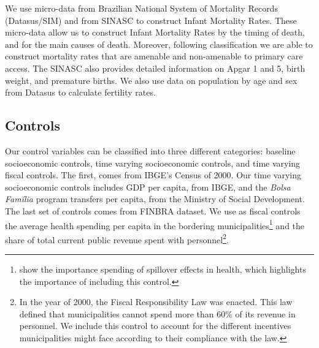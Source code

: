 We use micro-data from Brazilian National System of Mortality Records (Datasus/SIM) and from SINASC to construct Infant Mortality Rates. These micro-data allow us to construct Infant Mortality Rates by the timing of death, and for the main causes of death. Moreover, following \cite{alfradique2009internaccoes} classification we are able to construct mortality rates that are amenable and non-amenable to primary care access. The SINASC also provides detailed information on Apgar 1 and 5, birth weight, and premature births. We also use data on population by age and sex from Datasus to calculate fertility rates.


\subsection{Controls}

Our control variables can be classified into three different categories: baseline socioeconomic controls, time varying socioeconomic controls, and time varying fiscal controls. The first, comes from IBGE's Census of 2000. Our time varying socioeconomic controls includes GDP per capita, from IBGE, and the \emph{Bolsa Família} program transfers per capita, from the Ministry of Social Development. The last set of controls comes from FINBRA dataset. We use as fiscal controls the average health spending per capita in the bordering municipalities\footnote{\cite{castro2021effects} show the importance spending of spillover effects in health, which highlights the importance of including this control.} and the share of total current public revenue spent with personnel\footnote{In the year of 2000, the Fiscal Responsibility Law \citep{lrf} was enacted. This law defined that municipalities cannot spend more than 60\% of its revenue in personnel. We include this control to account for the different incentives municipalities might face according to their compliance with the law.}. 
